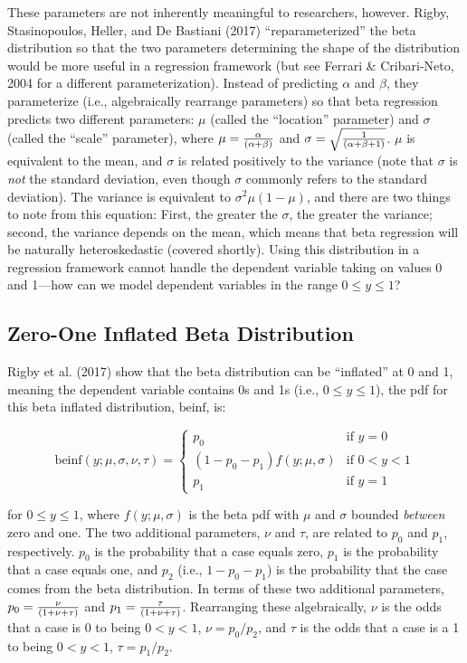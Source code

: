 \documentclass[english,man]{apa6}
\theoremstyle{definition}
\theoremstyle{definition}
\theoremstyle{remark}
\begin{document}
These parameters are not inherently meaningful to researchers, however.
Rigby, Stasinopoulos, Heller, and De Bastiani (2017)
\enquote{reparameterized} the beta distribution so that the two
parameters determining the shape of the distribution would be more
useful in a regression framework (but see Ferrari \& Cribari-Neto, 2004
for a different parameterization). Instead of predicting \(\alpha\) and
\(\beta\), they parameterize (i.e., algebraically rearrange parameters)
so that beta regression predicts two different parameters: \(\mu\)
(called the \enquote{location} parameter) and \(\sigma\) (called the
\enquote{scale} parameter), where \(\mu={\alpha\over(\alpha+\beta)}\)
and \(\sigma=\sqrt{1\over(\alpha+\beta+1)}\). \(\mu\) is equivalent to
the mean, and \(\sigma\) is related positively to the variance (note
that \(\sigma\) is \emph{not} the standard deviation, even though
\(\sigma\) commonly refers to the standard deviation). The variance is
equivalent to \(\sigma^2\mu(1-\mu)\), and there are two things to note
from this equation: First, the greater the \(\sigma\), the greater the
variance; second, the variance depends on the mean, which means that
beta regression will be naturally heteroskedastic (covered shortly).
Using this distribution in a regression framework cannot handle the
dependent variable taking on values 0 and 1---how can we model dependent
variables in the range \(0 \leq y \leq 1\)?

\subsection{Zero-One Inflated Beta
Distribution}\label{zero-one-inflated-beta-distribution}

Rigby et al. (2017) show that the beta distribution can be
\enquote{inflated} at 0 and 1, meaning the dependent variable contains
0s and 1s (i.e., \(0 \leq y \leq 1\)), the pdf for this beta inflated
distribution, \(\text{beinf}\), is:

\begin{center}
\[
\text{beinf}(y;\mu,\sigma,\nu,\tau) =
\begin{cases}
  p_0                             & \text{if } y = 0\\
  (1 - p_0 - p_1)f(y;\mu,\sigma)  & \text{if } 0 < y < 1\\
  p_1                             & \text{if } y = 1
\end{cases}
\]
\end{center}

for \(0 \leq y \leq 1\), where \(f(y;\mu,\sigma)\) is the beta pdf with
\(\mu\) and \(\sigma\) bounded \emph{between} zero and one. The two
additional parameters, \(\nu\) and \(\tau\), are related to \(p_0\) and
\(p_1\), respectively. \(p_0\) is the probability that a case equals
zero, \(p_1\) is the probability that a case equals one, and \(p_2\)
(i.e., \(1 - p_0 - p_1\)) is the probability that the case comes from
the beta distribution. In terms of these two additional parameters,
\(p_0 = {\nu \over (1 + \nu + \tau)}\) and
\(p_1 = {\tau \over (1 + \nu + \tau)}\). Rearranging these
algebraically, \(\nu\) is the odds that a case is 0 to being
\(0 < y < 1\), \(\nu = p_0 / p_2\), and \(\tau\) is the odds that a case
is a 1 to being \(0 < y < 1\), \(\tau = p_1 / p_2\).
\end{document}

